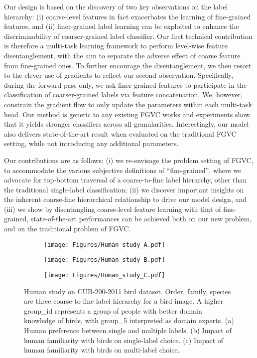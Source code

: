 \documentclass[final]{cvpr}
\begin{document}
Our design is based on the discovery of two key observations on the label hierarchy: (i) coarse-level features in fact exacerbates the learning of fine-grained features, and (ii) finer-grained label learning can be exploited to enhance the discriminability of coarser-grained label classifier. Our first technical contribution is therefore a multi-task learning framework to perform level-wise feature disentanglement, with the aim to separate the adverse effect of coarse feature from fine-grained ones. To further encourage the disentanglement, we then resort to the clever use of gradients to reflect our second observation. Specifically, during the forward pass only, we ask finer-grained features to participate in the classification of coarser-grained labels via feature concatenation. We, however, constrain the gradient flow to only update the parameters within each multi-task head. Our method is generic to any existing FGVC works and experiments show that it yields stronger classifiers across all granularities. Interestingly, our model also delivers state-of-the-art result when evaluated on the traditional FGVC setting, while not introducing any additional parameters. 

Our contributions are as follows: (i) we re-envisage the problem setting of FGVC, to accommodate the various subjective definitions of ``fine-grained'', where we advocate for top-bottom traversal of a coarse-to-fine label hierarchy, other than the traditional single-label classification; (ii) we discover important insights on the inherent coarse-fine hierarchical relationship to drive our model design, and (iii) we show by disentangling coarse-level feature learning with that of fine-grained, state-of-the-art performances can be achieved both on our new problem, and on the traditional problem of FGVC.

\begin{figure*}[!t]
  \centering
   \begin{subfigure}[t]{2.252in}
    \centering
    \texttt{[image: Figures/Human\_study\_A.pdf]}
    \caption{}
 \end{subfigure}
\begin{subfigure}[t]{2.265in}
    \centering
    \texttt{[image: Figures/Human\_study\_B.pdf]}
    \caption{}
 \end{subfigure}
\begin{subfigure}[t]{2.265in}
    \centering
    \texttt{[image: Figures/Human\_study\_C.pdf]}
    \caption{}
 \end{subfigure}

  \caption{Human study on CUB-200-2011 bird dataset. Order, family, species are three coarse-to-fine label hierarchy for a bird image. A higher group\_id represents a group of people with better domain knowledge of birds, with group\_5 interpreted as domain experts. (a) Human preference between single and multiple labels. (b) Impact of human familiarity with birds on single-label choice. (c) Impact of human familiarity with birds on multi-label choice.}
  \label{fig:Human_study}

\end{figure*}
\end{document}
